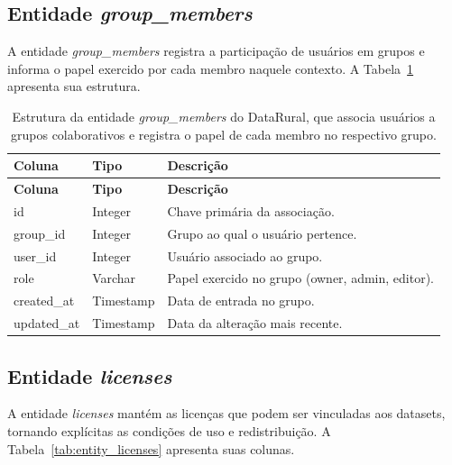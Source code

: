 \subsection{Entidade \textit{group\_members}}

A entidade \textit{group\_members} registra a participação de usuários em grupos e informa o papel exercido por cada membro naquele contexto. A Tabela~\ref{tab:entity_group_members} apresenta sua estrutura.

\begin{longtable}{p{}p{}p{}}
\caption{Estrutura da entidade \textit{group\_members} do DataRural, que associa usuários a grupos colaborativos e registra o papel de cada membro no respectivo grupo.}\label{tab:entity_group_members}\\
\toprule
\textbf{Coluna} & \textbf{Tipo} & \textbf{Descrição} \\
\midrule
\endfirsthead
\toprule
\textbf{Coluna} & \textbf{Tipo} & \textbf{Descrição} \\
\midrule
\endhead
id & Integer & Chave primária da associação. \\
group\_id & Integer & Grupo ao qual o usuário pertence. \\
user\_id & Integer & Usuário associado ao grupo. \\
role & Varchar & Papel exercido no grupo (owner, admin, editor). \\
created\_at & Timestamp & Data de entrada no grupo. \\
updated\_at & Timestamp & Data da alteração mais recente. \\
\bottomrule
\end{longtable}

\subsection{Entidade \textit{licenses}}

A entidade \textit{licenses} mantém as licenças que podem ser vinculadas aos datasets, tornando explícitas as condições de uso e redistribuição. A Tabela~\ref{tab:entity_licenses} apresenta suas colunas.

